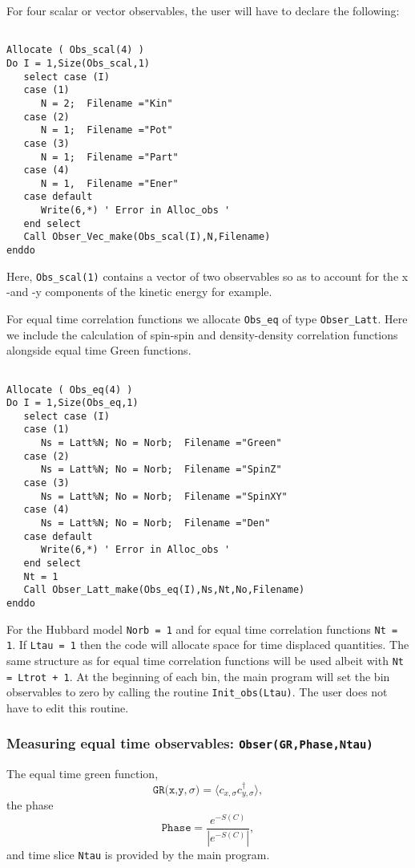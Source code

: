  For  four scalar  or vector observables,  the user will have to  declare the following: 
\begin{lstlisting}

Allocate ( Obs_scal(4) )
Do I = 1,Size(Obs_scal,1)
   select case (I)
   case (1)
      N = 2;  Filename ="Kin"
   case (2)
      N = 1;  Filename ="Pot"
   case (3)
      N = 1;  Filename ="Part"
   case (4)
      N = 1,  Filename ="Ener"
   case default
      Write(6,*) ' Error in Alloc_obs '  
   end select
   Call Obser_Vec_make(Obs_scal(I),N,Filename)
enddo
\end{lstlisting}
Here,   \texttt{Obs\_scal(1)}   contains a vector  of two observables  so as to account for the x -and -y components of the kinetic energy for example.  

For equal time correlation  functions  we allocate  \texttt{Obs\_eq}  of type \texttt{Obser\_Latt}.  Here we include the calculation of spin-spin and density-density correlation functions alongside equal time Green functions. 
\begin{lstlisting}

Allocate ( Obs_eq(4) )
Do I = 1,Size(Obs_eq,1)
   select case (I)
   case (1)
      Ns = Latt%N; No = Norb;  Filename ="Green"
   case (2)
      Ns = Latt%N; No = Norb;  Filename ="SpinZ"
   case (3)
      Ns = Latt%N; No = Norb;  Filename ="SpinXY"
   case (4)
      Ns = Latt%N; No = Norb;  Filename ="Den"
   case default
      Write(6,*) ' Error in Alloc_obs '  
   end select
   Nt = 1
   Call Obser_Latt_make(Obs_eq(I),Ns,Nt,No,Filename)
enddo
 \end{lstlisting} 
 For the Hubbard model \texttt{Norb = 1} and for   equal time correlation functions   \texttt{Nt = 1}.       If  \texttt{Ltau = 1}  then the code will allocate space for  time displaced quantities.   The same structure as for  equal time correlation functions will be used albeit with  \texttt{Nt = Ltrot + 1}.  At the beginning of each bin, the main program will set the bin observables to zero by calling  the routine 
 \texttt{Init\_obs(Ltau)}.   The user does not have to edit this routine. 
 
\subsubsection{Measuring equal time observables: \texttt{Obser(GR,Phase,Ntau)}}


The equal time  green function,
\begin{equation}
	 \texttt{GR(x,y},\sigma{\texttt)}  = \langle c^{\phantom{\dagger}}_{x,\sigma} c^{\dagger}_{y,\sigma}  \rangle,
\end{equation}
the  phase
\begin{equation}
	\texttt{Phase} =  \frac{e^{-S(C)}} { \left| e^{-S(C)} \right| },
\end{equation}
and time slice \texttt{Ntau}   is provided by the main program.  

